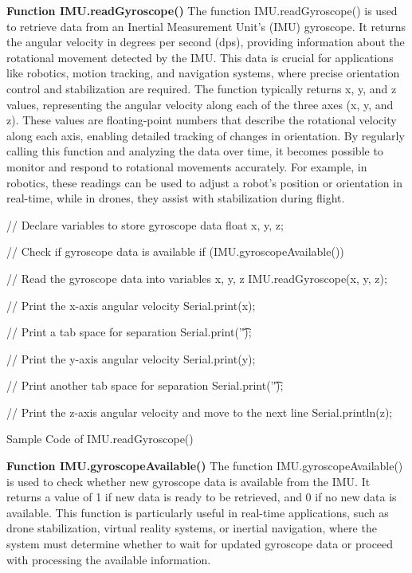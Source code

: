 \textbf{Function IMU.readGyroscope()}
The function IMU.readGyroscope() is used to retrieve data from an Inertial Measurement Unit's (IMU) gyroscope. It returns the angular velocity in degrees per second (dps), providing information about the rotational movement detected by the IMU. This data is crucial for applications like robotics, motion tracking, and navigation systems, where precise orientation control and stabilization are required.
The function typically returns x, y, and z values, representing the angular velocity along each of the three axes (x, y, and z). These values are floating-point numbers that describe the rotational velocity along each axis, enabling detailed tracking of changes in orientation. By regularly calling this function and analyzing the data over time, it becomes possible to monitor and respond to rotational movements accurately.
For example, in robotics, these readings can be used to adjust a robot’s position or orientation in real-time, while in drones, they assist with stabilization during flight.
\begin{code}[h!]
	\begin{Arduino}
  // Declare variables to store gyroscope data
  float x, y, z;
  
  // Check if gyroscope data is available
  if (IMU.gyroscopeAvailable()) {  
  	// Read the gyroscope data into variables x, y, z
  	IMU.readGyroscope(x, y, z);   
  	
  	// Print the x-axis angular velocity
  	Serial.print(x);               
  	
  	// Print a tab space for separation
  	Serial.print('\t');            
  	
  	// Print the y-axis angular velocity
  	Serial.print(y);               
  	
  	// Print another tab space for separation
  	Serial.print('\t');            
  	
  	// Print the z-axis angular velocity and move to the next line
  	Serial.println(z);             
  }
  
\end{Arduino}
\caption{Sample Code of IMU.readGyroscope()}\label{code:IMU.readGyroscope()}
\end{code}\newline
\textbf{Function IMU.gyroscopeAvailable()}
The function IMU.gyroscopeAvailable() is used to check whether new gyroscope data is available from the IMU. It returns a value of 1 if new data is ready to be retrieved, and 0 if no new data is available. This function is particularly useful in real-time applications, such as drone stabilization, virtual reality systems, or inertial navigation, where the system must determine whether to wait for updated gyroscope data or proceed with processing the available information.

